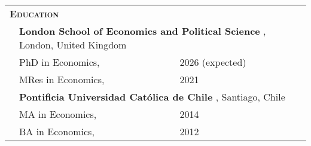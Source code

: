 \begin{tabular}{lll}

	\multicolumn{3}{l}{
		\large
		\textbf{%
			\textsc{%
				Education
			}
		}
	}
	\\[2ex]

	\indent
	&
	\multicolumn{2}{l}{
		\textbf{%
			London School of Economics and Political Science%
		}%
		,
		London,
		United Kingdom
	}
	\\[.5ex]
	
	  
	& PhD in Economics,
	& 2026 \normalsize{(expected)}
	\\
	
	  
	& MRes in Economics,
	& 2021
	\\[1em]
	
	&
	\multicolumn{2}{l}{
		\textbf{%
			Pontificia Universidad Cat\'olica de Chile%
		}%
		,
		Santiago,
		Chile
	}
	\\[.5ex]
	
	  
	& MA in Economics,
	& 2014
	\\
	
	  
	& BA in Economics,
	& 2012
	
\end{tabular}